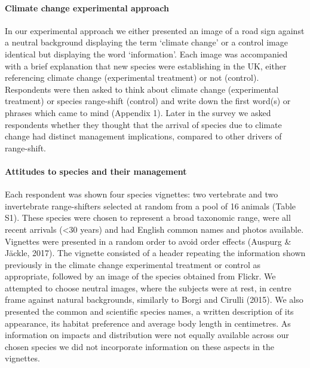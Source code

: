 \documentclass[
]{article}
\begin{document}
\hypertarget{climate-change-experimental-approach}{%
\paragraph{Climate change experimental
approach}\label{climate-change-experimental-approach}}

In our experimental approach we either presented an image of a road sign
against a neutral background displaying the term `climate change' or a
control image identical but displaying the word `information'. Each
image was accompanied with a brief explanation that new species were
establishing in the UK, either referencing climate change (experimental
treatment) or not (control). Respondents were then asked to think about
climate change (experimental treatment) or species range-shift (control)
and write down the first word(s) or phrases which came to mind (Appendix
1). Later in the survey we asked respondents whether they thought that
the arrival of species due to climate change had distinct management
implications, compared to other drivers of range-shift.

\hypertarget{attitudes-to-species-and-their-management}{%
\paragraph{Attitudes to species and their
management}\label{attitudes-to-species-and-their-management}}

Each respondent was shown four species vignettes: two vertebrate and two
invertebrate range-shifters selected at random from a pool of 16 animals
(Table S1). These species were chosen to represent a broad taxonomic
range, were all recent arrivals (\textless30 years) and had English
common names and photos available. Vignettes were presented in a random
order to avoid order effects (Auspurg \& Jäckle, 2017). The vignette
consisted of a header repeating the information shown previously in the
climate change experimental treatment or control as appropriate,
followed by an image of the species obtained from Flickr. We attempted
to choose neutral images, where the subjects were at rest, in centre
frame against natural backgrounds, similarly to Borgi and Cirulli
(2015). We also presented the common and scientific species names, a
written description of its appearance, its habitat preference and
average body length in centimetres. As information on impacts and
distribution were not equally available across our chosen species we did
not incorporate information on these aspects in the vignettes.
\end{document}
